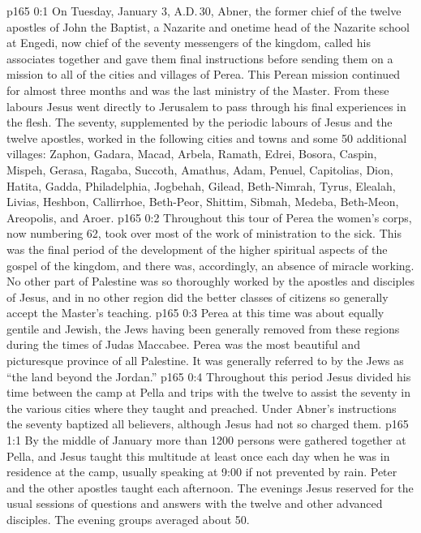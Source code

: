 \author{Midwayer Commission}
\vs p165 0:1 On Tuesday, January 3, A.D.\,30, Abner, the former chief of the twelve apostles of John the Baptist, a Nazarite and onetime head of the Nazarite school at Engedi, now chief of the seventy messengers of the kingdom, called his associates together and gave them final instructions before sending them on a mission to all of the cities and villages of Perea. This Perean mission continued for almost three months and was the last ministry of the Master. From these labours Jesus went directly to Jerusalem to pass through his final experiences in the flesh. The seventy, supplemented by the periodic labours of Jesus and the twelve apostles, worked in the following cities and towns and some 50 additional villages: Zaphon, Gadara, Macad, Arbela, Ramath, Edrei, Bosora, Caspin, Mispeh, Gerasa, Ragaba, Succoth, Amathus, Adam, Penuel, Capitolias, Dion, Hatita, Gadda, Philadelphia, Jogbehah, Gilead, Beth\hyp{}Nimrah, Tyrus, Elealah, Livias, Heshbon, Callirrhoe, Beth\hyp{}Peor, Shittim, Sibmah, Medeba, Beth\hyp{}Meon, Areopolis, and Aroer.
\vs p165 0:2 Throughout this tour of Perea the women’s corps, now numbering 62, took over most of the work of ministration to the sick. This was the final period of the development of the higher spiritual aspects of the gospel of the kingdom, and there was, accordingly, an absence of miracle working. No other part of Palestine was so thoroughly worked by the apostles and disciples of Jesus, and in no other region did the better classes of citizens so generally accept the Master’s teaching.
\vs p165 0:3 Perea at this time was about equally gentile and Jewish, the Jews having been generally removed from these regions during the times of Judas Maccabee. Perea was the most beautiful and picturesque province of all Palestine. It was generally referred to by the Jews as “the land beyond the Jordan.”
\vs p165 0:4 Throughout this period Jesus divided his time between the camp at Pella and trips with the twelve to assist the seventy in the various cities where they taught and preached. Under Abner’s instructions the seventy baptized all believers, although Jesus had not so charged them.
\vs p165 1:1 By the middle of January more than 1200 persons were gathered together at Pella, and Jesus taught this multitude at least once each day when he was in residence at the camp, usually speaking at 9:00 if not prevented by rain. Peter and the other apostles taught each afternoon. The evenings Jesus reserved for the usual sessions of questions and answers with the twelve and other advanced disciples. The evening groups averaged about 50.
